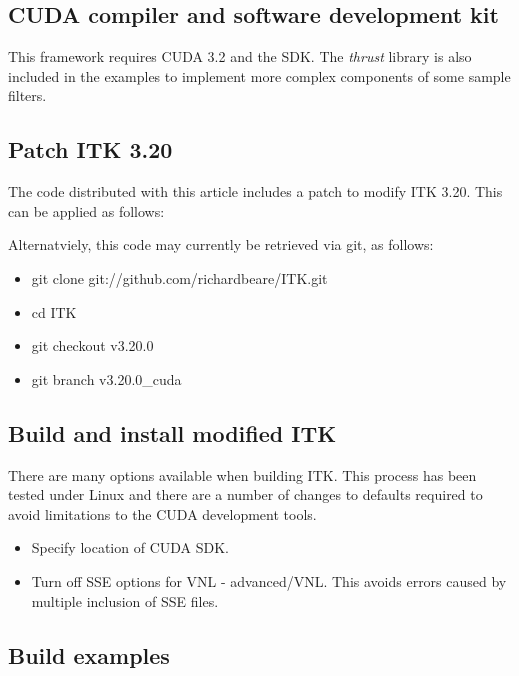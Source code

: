\documentclass{InsightArticle}
\begin{document}
\subsection{CUDA compiler and software development kit}
This framework requires CUDA 3.2 and the SDK. The {\em thrust} library
is also included in the examples to implement more complex components
of some sample filters.
\subsection{Patch ITK 3.20}
The code distributed with this article includes a patch to modify ITK 3.20. This can be applied as follows:


Alternatviely, this code may currently be retrieved via git, as follows:
\begin{itemize}
\item git clone git://github.com/richardbeare/ITK.git
\item cd ITK
\item git checkout v3.20.0
\item git branch v3.20.0_cuda
\end{itemize}

\subsection{Build and install modified ITK}
There are many options available when building ITK. This process has
been tested under Linux and there are a number of changes to defaults
required to avoid limitations to the CUDA development tools. 
\begin{itemize}
  \item Specify location of CUDA SDK.
  \item Turn off SSE options for VNL - advanced/VNL. This avoids errors caused by multiple inclusion of SSE files.
\end{itemize}

\subsection{Build examples}
\end{document}
